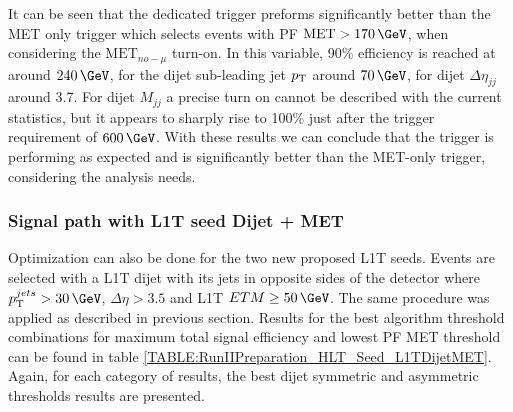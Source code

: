 It can be seen that the dedicated trigger preforms significantly better than the \gls{MET} only trigger which selects events with \gls{PF} $\text{MET}>170\,\GeV$, when considering the $\text{MET}_{no-\mu}$ turn-on. In this variable, 90\% efficiency is reached at around 
$240\,\GeV$, for the dijet sub-leading jet $p_{\mathrm{T}}$ around $70\,\GeV$, for dijet $\Delta\eta_{jj}$ around 3.7. For dijet $M_{jj}$ a precise turn on cannot be described with the current statistics, but it appears to sharply rise to 100\% just after the trigger requirement of $600\,\GeV$. With these results we can conclude that the trigger is performing as expected and is significantly better than the \gls{MET}-only trigger, considering the analysis needs.

\subsubsection{Signal path with L1T seed Dijet + MET}
\label{SECTION:RunIITriggerStudies_HLTAlgorithmDevelopment_L1TDijetMET}


Optimization can also be done for the two new proposed \gls{L1T} seeds. Events are selected with a \gls{L1T} dijet with its jets in opposite sides of the detector where $\pt^{jets}>30\,\GeV$, $\Delta\eta>3.5$ and \gls{L1T} $ETM \geq 50\,\GeV$. The same procedure was applied as described in previous section. Results for the best algorithm threshold combinations for maximum total signal efficiency and lowest \gls{PF} \gls{MET} threshold can be found in table \ref{TABLE:RunIIPreparation_HLT_Seed_L1TDijetMET}. Again, for each category of results, the best dijet symmetric and asymmetric \pt thresholds results are presented.

